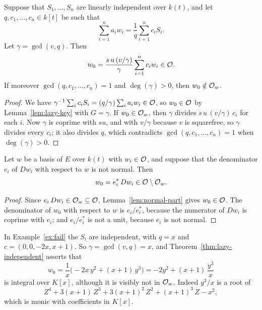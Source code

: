 \begin{theorem}\label{thm:lazy-independent}
Suppose that $S_1, \dots, S_n$ are linearly independent over $k(t)$, and let
$q, c_1, \dots, c_n \in k[t]$ be such that
\[
  \sum_{i=1}^n a_i w_i = \frac{1}{q} \sum_{i=1}^n c_i S_i .
\]
Let $\gamma = \gcd(v, q)$. Then
\[
  w_0 = \frac{s\,u\,(v/\gamma)}{\gamma} \sum_{i=1}^n c_i w_i \in \mathcal{O} .
\]
If moreover $\gcd(q, c_1, \dots, c_n) = 1$ and $\deg(\gamma) > 0$, then $w_0
\notin \mathcal{O}_w$.
\end{theorem}

\begin{proof}
We have $\gamma^{-1} \sum_i c_i S_i = (q/\gamma) \sum_i a_i w_i \in \mathcal{O}$, so
$w_0 \in \mathcal{O}$ by Lemma~\ref{lem:lazy-key} with $G = \gamma$. If $w_0 \in
\mathcal{O}_w$, then $\gamma$ divides $s\,u\,(v/\gamma)\,c_i$ for each $i$. Now
$\gamma$ is coprime with $s u$, and with $v/\gamma$ because $v$ is
squarefree, so $\gamma$ divides every $c_i$; it also divides $q$, which
contradicts $\gcd(q, c_1, \dots, c_n) = 1$ when $\deg(\gamma) > 0$.
\end{proof}

\begin{theorem}\label{thm:lazy-unsuitable}
Let $w$ be a basis of $E$ over $k(t)$ with $w_i \in \mathcal{O}$, and suppose that
the denominator $e_i$ of $Dw_i$ with respect to $w$ is not normal. Then
\[
  w_0 = e_i^*\, Dw_i \in \mathcal{O} \setminus \mathcal{O}_w .
\]
\end{theorem}

\begin{proof}
Since $e_i\, Dw_i \in \mathcal{O}_w \subseteq \mathcal{O}$, Lemma~\ref{lem:normal-part} gives
$w_0 \in \mathcal{O}$. The denominator of $w_0$ with respect to $w$ is $e_i / e_i^*$,
because the numerator of $Dw_i$ is coprime with $e_i$; and $e_i / e_i^*$ is
not a unit, because $e_i$ is not normal.
\end{proof}

\begin{example}\label{ex:fail-w0}
In Example~\ref{ex:fail} the $S_i$ are independent, with $q = x$ and $c =
(0, 0, -2x, x + 1)$. So $\gamma = \gcd(v, q) = x$, and
Theorem~\ref{thm:lazy-independent} asserts that
\[
  w_0 = \frac{1}{x} \bigl( -2x\, y^2 + (x + 1)\, y^3 \bigr)
      = -2 y^2 + (x + 1)\, \frac{y^3}{x}
\]
is integral over $K[x]$, although it is visibly not in $\mathcal{O}_w$. Indeed $y^3/x$
is a root of
\[
  Z^4 + 3 (x + 1)\, Z^3 + 3 (x + 1)^2\, Z^2 + (x + 1)^3\, Z - x^2 ,
\]
which is monic with coefficients in $K[x]$.
\end{example}

